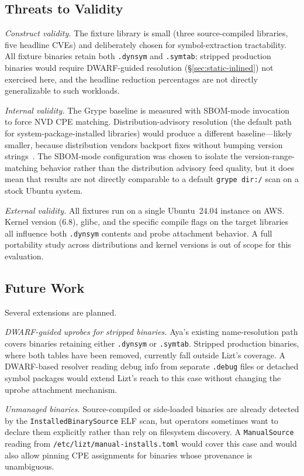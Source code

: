 \documentclass[conference]{IEEEtran}
\begin{document}
\subsection{Threats to Validity}

\emph{Construct validity.} The fixture library is small (three source-compiled libraries, five headline CVEs) and deliberately chosen for symbol-extraction tractability. All fixture binaries retain both \texttt{.dynsym} and \texttt{.symtab}; stripped production binaries would require DWARF-guided resolution (\S\ref{sec:static-inlined}) not exercised here, and the headline reduction percentages are not directly generalizable to such workloads.

\emph{Internal validity.} The Grype baseline is measured with SBOM-mode invocation to force NVD CPE matching. Distribution-advisory resolution (the default path for system-package-installed libraries) would produce a different baseline---likely smaller, because distribution vendors backport fixes without bumping version strings~\cite{redhat_backporting}. The SBOM-mode configuration was chosen to isolate the version-range-matching behavior rather than the distribution advisory feed quality, but it does mean that results are not directly comparable to a default \texttt{grype dir:/} scan on a stock Ubuntu system.

\emph{External validity.} All fixtures run on a single Ubuntu~24.04 instance on AWS. Kernel version (6.8), glibc, and the specific compile flags on the target libraries all influence both \texttt{.dynsym} contents and probe attachment behavior. A full portability study across distributions and kernel versions is out of scope for this evaluation.


\subsection{Future Work}
\label{sec:future-work}

Several extensions are planned.

\emph{DWARF-guided uprobes for stripped binaries.} Aya's existing name-resolution path covers binaries retaining either \texttt{.dynsym} or \texttt{.symtab}. Stripped production binaries, where both tables have been removed, currently fall outside Lizt's coverage. A DWARF-based resolver reading debug info from separate \texttt{.debug} files or detached symbol packages would extend Lizt's reach to this case without changing the uprobe attachment mechanism.

\emph{Unmanaged binaries.} Source-compiled or side-loaded binaries are already detected by the \texttt{InstalledBinarySource} ELF scan, but operators sometimes want to declare them explicitly rather than rely on filesystem discovery. A \texttt{ManualSource} reading from \texttt{/etc/lizt/manual-installs.toml} would cover this case and would also allow pinning CPE assignments for binaries whose provenance is unambiguous.
\end{document}
